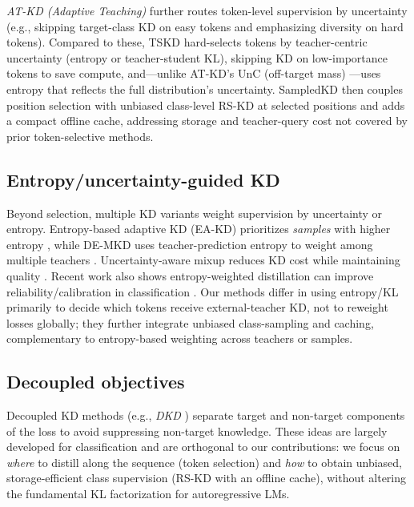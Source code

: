 \documentclass[11pt]{article}
\begin{document}
\emph{AT-KD (Adaptive Teaching)} \citep{zhong2024atkd} further routes token-level supervision by uncertainty (e.g., skipping target-class KD on easy tokens and emphasizing diversity on hard tokens).
Compared to these, TSKD hard-selects tokens by teacher-centric uncertainty (entropy or teacher-student KL), skipping KD on low-importance tokens to save compute, and—unlike AT-KD's UnC (off-target mass) \citep{zhong2024atkd}—uses entropy that reflects the full distribution's uncertainty.
SampledKD then couples position selection with unbiased class-level RS-KD at selected positions and adds a compact offline cache, addressing storage and teacher-query cost not covered by prior token-selective methods.

\subsection{Entropy/uncertainty-guided KD}
Beyond selection, multiple KD variants weight supervision by uncertainty or entropy.
Entropy-based adaptive KD (EA-KD) prioritizes \emph{samples} with higher entropy \citep{su2023eakd}, while DE-MKD uses teacher-prediction entropy to weight among multiple teachers \citep{cheng2024demkd}.
Uncertainty-aware mixup reduces KD cost while maintaining quality \citep{xu2023unix}.
Recent work also shows entropy-weighted distillation can improve reliability/calibration in classification \citep{guo2024entropykd}.
Our methods differ in using entropy/KL primarily to decide which tokens receive external-teacher KD, not to reweight losses globally; they further integrate unbiased class-sampling and caching, complementary to entropy-based weighting across teachers or samples.

\subsection{Decoupled objectives}
Decoupled KD methods (e.g., \emph{DKD} \citep{zhao2022dkd}) separate target and non-target components of the loss to avoid suppressing non-target knowledge. These ideas are largely developed for classification and are orthogonal to our contributions: we focus on \emph{where} to distill along the sequence (token selection) and \emph{how} to obtain unbiased, storage-efficient class supervision (RS-KD with an offline cache), without altering the fundamental KL factorization for autoregressive LMs.

\end{document}
